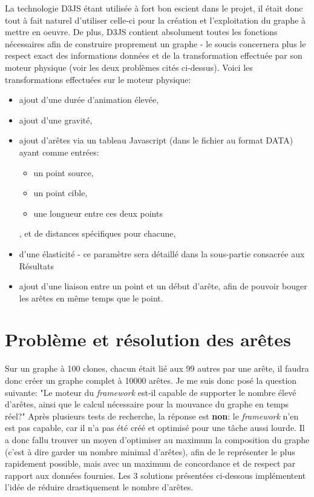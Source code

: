 \documentclass[pdftex,12pt,a4paper]{report}
\begin{document}
\begin{spacing}{1.2}
La technologie D3JS étant utilisée à fort bon escient dans le projet, il était donc tout à fait naturel d'utiliser celle-ci pour la création et l'exploitation du graphe à mettre en oeuvre.
De plus, D3JS contient absolument toutes les fonctions nécessaires afin de construire proprement un graphe - le soucis concernera plus le respect exact des informations données et de la transformation effectuée par son moteur physique (voir les deux problèmes cités ci-dessus).
\newline
Voici les transformations effectuées sur le moteur physique:
\begin{itemize}
\item{ajout d'une durée d'animation élevée,}
\item{ajout d'une gravité,}
\item{ajout d'arêtes via un tableau Javascript (dans le fichier au format DATA) ayant comme entrées:	
\begin{itemize}
\item{un point source,}
\item{un point cible,}
\item{une longueur entre ces deux points}
\end{itemize}
, et de distances spécifiques pour chacune,}
\item{d'une élasticité - ce paramètre sera détaillé dans la sous-partie consacrée aux Résultats}
\item{ajout d'une liaison entre un point et un début d'arête, afin de pouvoir bouger les arêtes en même temps que le point.}
\end{itemize}

\section{Problème et résolution des arêtes}

Sur un graphe à 100 clones, chacun était lié aux 99 autres par une arête, il faudra donc créer un graphe complet à 10000 arêtes. 
Je me suis donc posé la question suivante: "Le moteur du \textit{framework} est-il capable de supporter le nombre élevé d'arêtes, ainsi que le calcul nécessaire pour la mouvance du graphe en temps réel?"
\newline
Après plusieurs tests de recherche, la réponse est \textbf{non}: le \textit{framework} n'en est pas capable, car il n'a pas été créé et optimisé pour une tâche aussi lourde.
\newline
Il a donc fallu trouver un moyen d'optimiser au maximum la composition du graphe (c'est à dire garder un nombre minimal d'arêtes), afin de le représenter le plus rapidement possible, mais avec un maximum de concordance et de respect par rapport aux données fournies.
\newline
Les 3 solutions présentées ci-dessous implémentent l'idée de réduire drastiquement le nombre d'arêtes.


\end{spacing}
\end{document}

